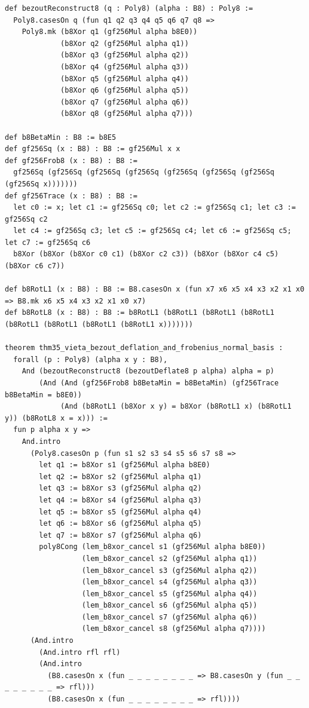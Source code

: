 \documentclass[10pt,twocolumn]{article}
\theoremstyle{spectralthm}
\begin{document}
\begin{lstlisting}[language=Lean4,caption={Standalone Pure Init.Prelude Term-Mode Lean 4 Expansion (thm30--thm37, v1.1.0, 0 sorry, 0 axioms).},label={lst:lean_v110}]
def bezoutReconstruct8 (q : Poly8) (alpha : B8) : Poly8 :=
  Poly8.casesOn q (fun q1 q2 q3 q4 q5 q6 q7 q8 =>
    Poly8.mk (b8Xor q1 (gf256Mul alpha b8E0))
             (b8Xor q2 (gf256Mul alpha q1))
             (b8Xor q3 (gf256Mul alpha q2))
             (b8Xor q4 (gf256Mul alpha q3))
             (b8Xor q5 (gf256Mul alpha q4))
             (b8Xor q6 (gf256Mul alpha q5))
             (b8Xor q7 (gf256Mul alpha q6))
             (b8Xor q8 (gf256Mul alpha q7)))

def b8BetaMin : B8 := b8E5
def gf256Sq (x : B8) : B8 := gf256Mul x x
def gf256Frob8 (x : B8) : B8 :=
  gf256Sq (gf256Sq (gf256Sq (gf256Sq (gf256Sq (gf256Sq (gf256Sq (gf256Sq x)))))))
def gf256Trace (x : B8) : B8 :=
  let c0 := x; let c1 := gf256Sq c0; let c2 := gf256Sq c1; let c3 := gf256Sq c2
  let c4 := gf256Sq c3; let c5 := gf256Sq c4; let c6 := gf256Sq c5; let c7 := gf256Sq c6
  b8Xor (b8Xor (b8Xor c0 c1) (b8Xor c2 c3)) (b8Xor (b8Xor c4 c5) (b8Xor c6 c7))

def b8RotL1 (x : B8) : B8 := B8.casesOn x (fun x7 x6 x5 x4 x3 x2 x1 x0 => B8.mk x6 x5 x4 x3 x2 x1 x0 x7)
def b8RotL8 (x : B8) : B8 := b8RotL1 (b8RotL1 (b8RotL1 (b8RotL1 (b8RotL1 (b8RotL1 (b8RotL1 (b8RotL1 x)))))))

theorem thm35_vieta_bezout_deflation_and_frobenius_normal_basis :
  forall (p : Poly8) (alpha x y : B8),
    And (bezoutReconstruct8 (bezoutDeflate8 p alpha) alpha = p)
        (And (And (gf256Frob8 b8BetaMin = b8BetaMin) (gf256Trace b8BetaMin = b8E0))
             (And (b8RotL1 (b8Xor x y) = b8Xor (b8RotL1 x) (b8RotL1 y)) (b8RotL8 x = x))) :=
  fun p alpha x y =>
    And.intro
      (Poly8.casesOn p (fun s1 s2 s3 s4 s5 s6 s7 s8 =>
        let q1 := b8Xor s1 (gf256Mul alpha b8E0)
        let q2 := b8Xor s2 (gf256Mul alpha q1)
        let q3 := b8Xor s3 (gf256Mul alpha q2)
        let q4 := b8Xor s4 (gf256Mul alpha q3)
        let q5 := b8Xor s5 (gf256Mul alpha q4)
        let q6 := b8Xor s6 (gf256Mul alpha q5)
        let q7 := b8Xor s7 (gf256Mul alpha q6)
        poly8Cong (lem_b8xor_cancel s1 (gf256Mul alpha b8E0))
                  (lem_b8xor_cancel s2 (gf256Mul alpha q1))
                  (lem_b8xor_cancel s3 (gf256Mul alpha q2))
                  (lem_b8xor_cancel s4 (gf256Mul alpha q3))
                  (lem_b8xor_cancel s5 (gf256Mul alpha q4))
                  (lem_b8xor_cancel s6 (gf256Mul alpha q5))
                  (lem_b8xor_cancel s7 (gf256Mul alpha q6))
                  (lem_b8xor_cancel s8 (gf256Mul alpha q7))))
      (And.intro
        (And.intro rfl rfl)
        (And.intro
          (B8.casesOn x (fun _ _ _ _ _ _ _ _ => B8.casesOn y (fun _ _ _ _ _ _ _ _ => rfl)))
          (B8.casesOn x (fun _ _ _ _ _ _ _ _ => rfl))))


\end{lstlisting}
\end{document}
